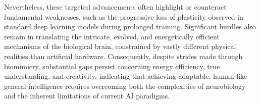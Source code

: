 \documentclass[
10pt, %
a4paper, %
oneside, %
headinclude,footinclude, %
BCOR5mm, %
]{scrartcl}
\begin{document}
Nevertheless, these targeted advancements often highlight or counteract fundamental weaknesses, such as the progressive loss of plasticity observed in standard deep learning models during prolonged training. Significant hurdles also remain in translating the intricate, evolved, and energetically efficient mechanisms of the biological brain, constrained by vastly different physical realities than artificial hardware. Consequently, despite strides made through biomimicry, substantial gaps persist concerning energy efficiency, true understanding, and creativity, indicating that achieving adaptable, human-like general intelligence requires overcoming both the complexities of neurobiology and the inherent limitations of current AI paradigms.
\newpage
\nocite{*}





\end{document}
